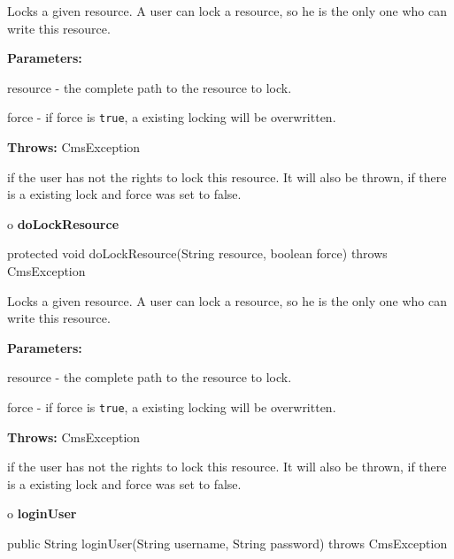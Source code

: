 \begin{description}
\htmlDD Locks a given resource. \htmlBR
A user can lock a resource, so he is the only one who can write this resource.


\begin{description}
\item {\bf Parameters:}  

resource - the complete path to the resource to lock.  

force - if force is {\tt true}, a existing locking will be overwritten.  
\item {\bf Throws:} CmsException  

if the user has not the rights to lock this resource. It will also be thrown,
if there is a existing lock and force was set to false.  
\end{description}

\end{description}

o {\bf doLockResource} 

\begin{PRE}
 protected void doLockResource(String resource,
                               boolean force) throws CmsException
\end{PRE}

\begin{description}
\htmlDD Locks a given resource. \htmlBR
A user can lock a resource, so he is the only one who can write this resource.


\begin{description}
\item {\bf Parameters:}  

resource - the complete path to the resource to lock.  

force - if force is {\tt true}, a existing locking will be overwritten.  
\item {\bf Throws:} CmsException  

if the user has not the rights to lock this resource. It will also be thrown,
if there is a existing lock and force was set to false.  
\end{description}

\end{description}

o {\bf loginUser} 

\begin{PRE}
 public String loginUser(String username,
                         String password) throws CmsException
\end{PRE}

